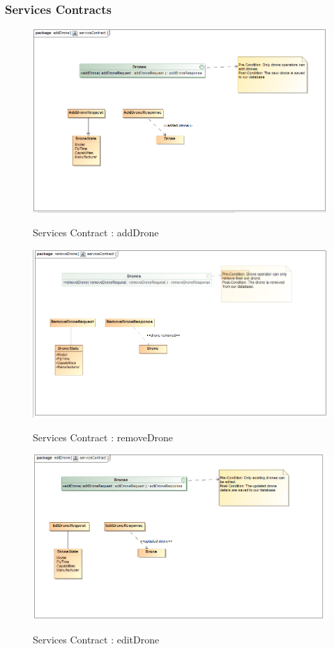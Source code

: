 \documentclass{article}
\begin{document}
	\subsubsection{Services Contracts}

		\begin{figure}[H]
			\includegraphics[width=\textwidth]{SC_add.png}  \\
			\caption{Services Contract : addDrone}
		\end{figure}
		\begin{figure}[H]
			\includegraphics[width=\textwidth]{sc_delete.png}  \\
			\caption{Services Contract : removeDrone}
		\end{figure}
		\begin{figure}[H]
			\includegraphics[width=\textwidth]{sc_edit.png}  \\
			\caption{Services Contract : editDrone}
		\end{figure}
\end{document}
